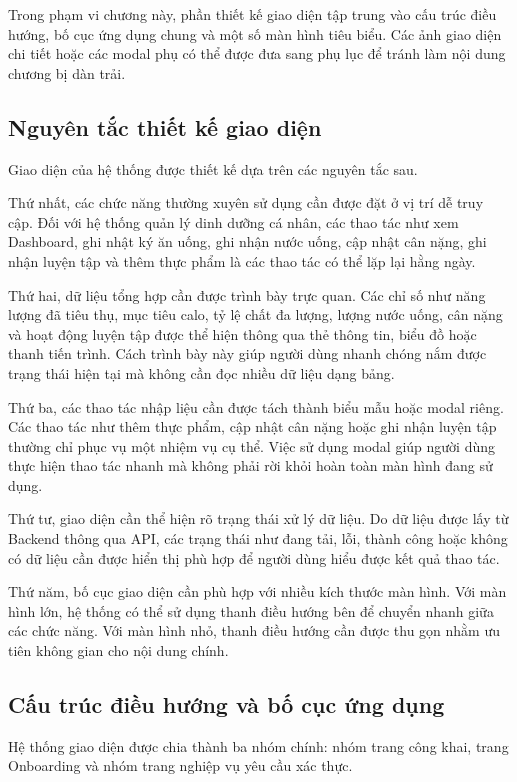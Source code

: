 \documentclass[12pt, a4paper]{report}
\begin{document}
Trong phạm vi chương này, phần thiết kế giao diện tập trung vào cấu trúc điều hướng, bố cục ứng dụng chung và một số màn hình tiêu biểu. Các ảnh giao diện chi tiết hoặc các modal phụ có thể được đưa sang phụ lục để tránh làm nội dung chương bị dàn trải.

\subsection{Nguyên tắc thiết kế giao diện}Giao diện của hệ thống được thiết kế dựa trên các nguyên tắc sau.

Thứ nhất, các chức năng thường xuyên sử dụng cần được đặt ở vị trí dễ truy cập. Đối với hệ thống quản lý dinh dưỡng cá nhân, các thao tác như xem Dashboard, ghi nhật ký ăn uống, ghi nhận nước uống, cập nhật cân nặng, ghi nhận luyện tập và thêm thực phẩm là các thao tác có thể lặp lại hằng ngày.

Thứ hai, dữ liệu tổng hợp cần được trình bày trực quan. Các chỉ số như năng lượng đã tiêu thụ, mục tiêu calo, tỷ lệ chất đa lượng, lượng nước uống, cân nặng và hoạt động luyện tập được thể hiện thông qua thẻ thông tin, biểu đồ hoặc thanh tiến trình. Cách trình bày này giúp người dùng nhanh chóng nắm được trạng thái hiện tại mà không cần đọc nhiều dữ liệu dạng bảng.

Thứ ba, các thao tác nhập liệu cần được tách thành biểu mẫu hoặc modal riêng. Các thao tác như thêm thực phẩm, cập nhật cân nặng hoặc ghi nhận luyện tập thường chỉ phục vụ một nhiệm vụ cụ thể. Việc sử dụng modal giúp người dùng thực hiện thao tác nhanh mà không phải rời khỏi hoàn toàn màn hình đang sử dụng.

Thứ tư, giao diện cần thể hiện rõ trạng thái xử lý dữ liệu. Do dữ liệu được lấy từ Backend thông qua API, các trạng thái như đang tải, lỗi, thành công hoặc không có dữ liệu cần được hiển thị phù hợp để người dùng hiểu được kết quả thao tác.

Thứ năm, bố cục giao diện cần phù hợp với nhiều kích thước màn hình. Với màn hình lớn, hệ thống có thể sử dụng thanh điều hướng bên để chuyển nhanh giữa các chức năng. Với màn hình nhỏ, thanh điều hướng cần được thu gọn nhằm ưu tiên không gian cho nội dung chính.

\subsection{Cấu trúc điều hướng và bố cục ứng dụng}Hệ thống giao diện được chia thành ba nhóm chính: nhóm trang công khai, trang Onboarding và nhóm trang nghiệp vụ yêu cầu xác thực.
\end{document}
